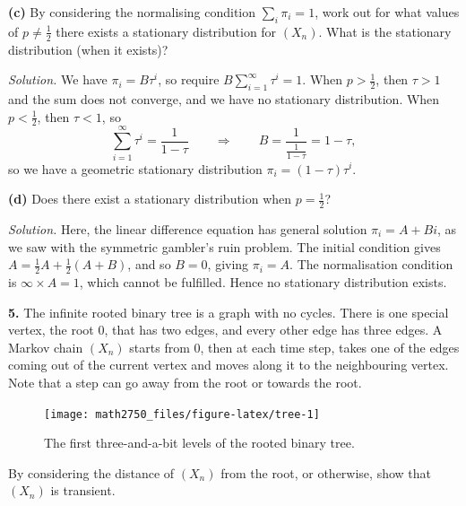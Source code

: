 \documentclass[
  a4paper,
]{article}
\theoremstyle{definition}
\theoremstyle{definition}
\theoremstyle{definition}
\theoremstyle{remark}
\begin{document}
\textbf{(c)} By considering the normalising condition \(\sum_i \pi_i =1\), work out for what values of \(p \neq \frac12\) there exists a stationary distribution for \((X_n)\). What is the stationary distribution (when it exists)?

\begin{myanswers}
\emph{Solution.} We have \(\pi_i = B\tau^i\), so require \(B \sum_{i=1}^\infty \tau^i = 1\). When \(p > \frac12\), then \(\tau > 1\) and the sum does not converge, and we have no stationary distribution. When \(p < \frac12\), then \(\tau < 1\), so
\[ \sum_{i=1}^\infty \tau^i = \frac{1}{1-\tau} \qquad \Rightarrow \qquad B = \frac{1}{\frac{1}{1-\tau}} = 1 - \tau, \]
so we have a geometric stationary distribution \(\pi_i = (1-\tau)\tau^i\).

\end{myanswers}

\textbf{(d)} Does there exist a stationary distribution when \(p = \frac12\)?

\begin{myanswers}
\emph{Solution.}
Here, the linear difference equation has general solution \(\pi_i = A + Bi\), as we saw with the symmetric gambler's ruin problem. The initial condition gives \(A = \frac12A + \frac12(A + B)\), and so \(B = 0\), giving \(\pi_i = A\). The normalisation condition is \(\infty \times A = 1\), which cannot be fulfilled. Hence no stationary distribution exists.

\end{myanswers}

\textbf{5.} The infinite rooted binary tree is a graph with no cycles. There is one special vertex, the root 0, that has two edges, and every other edge has three edges. A Markov chain \((X_n)\) starts from 0, then at each time step, takes one of the edges coming out of the current vertex and moves along it to the neighbouring vertex. Note that a step can go away from the root or towards the root.

\begin{figure}

{\centering \texttt{[image: math2750\_files/figure-latex/tree-1]} 

}

\caption{The first three-and-a-bit levels of the rooted binary tree.}\label{fig:tree}
\end{figure}

By considering the distance of \((X_n)\) from the root, or otherwise, show that \((X_n)\) is transient.
\end{document}
